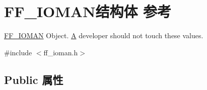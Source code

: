 \hypertarget{struct_f_f___i_o_m_a_n}{}\section{F\+F\+\_\+\+I\+O\+M\+A\+N结构体 参考}
\label{struct_f_f___i_o_m_a_n}


\hyperlink{struct_f_f___i_o_m_a_n}{F\+F\+\_\+\+I\+O\+M\+AN} Object. \hyperlink{struct_a}{A} developer should not touch these values.  




{\ttfamily \#include $<$ff\+\_\+ioman.\+h$>$}

\subsection*{Public 属性}
